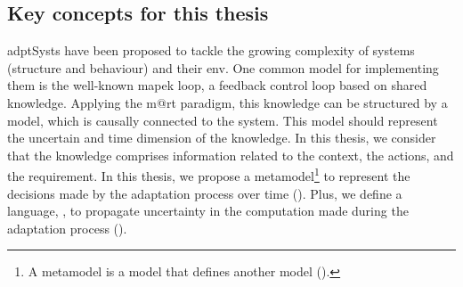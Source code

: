 \subsection{Key concepts for this thesis}
\Glspl{adptSyst} have been proposed to tackle the growing complexity of systems (structure and behaviour) and their \gls{env}.
One common model for implementing them is the well-known \gls{mapek} loop, a feedback control loop based on shared knowledge.
Applying the \gls{m@rt} paradigm, this knowledge can be structured by a \gls{model}, which is causally connected to the system.
This \gls{model} should represent the uncertain and time dimension of the knowledge.
In this thesis, we consider that the knowledge comprises information related to the context, the actions, and the requirement.
In this thesis, we propose a \gls{metamodel}\footnote{A \gls{metamodel} is a \gls{model} that defines another \gls{model} (\cf {}).} to represent the decisions made by the adaptation process over time (\cf {}).
Plus, we define a language, \langName, to propagate uncertainty in the computation made during the adaptation process (\cf {}).







